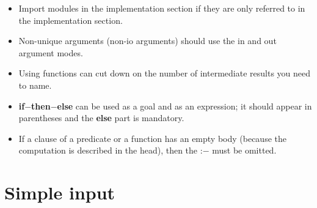 \documentclass[a4paper,11pt,notitlepage,onecolumn]{book}
\begin{document}
\begin{itemize}
\item Import modules in the implementation section if they are only referred
to in the implementation section.
\item Non-unique arguments (\ie non-\textsf{io} arguments) should use the \textsf{in}
and \textsf{out} argument modes.
\item Using functions can cut down on the number of intermediate results you
need to name.
\item \textsf{\textbf{if}{\ensuremath{-}}\textbf{then}{\ensuremath{-}}\textbf{else}} can be used as a goal and as an expression; it should
appear in parentheses and the \textsf{\textbf{else}} part is mandatory.
\item If a clause of a predicate or a function has an empty body (because
the computation is described in the head), then the \textsf{:{\ensuremath{-}}} must be omitted.
\end{itemize}





\newpage





\section{Simple input}
\end{document}
